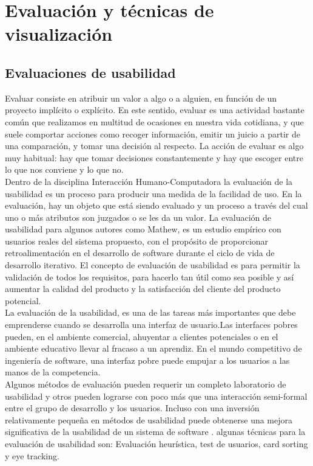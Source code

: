 \chapter{Evaluación y técnicas de visualización}\label{cap.Evaluacion}
\section{Evaluaciones de usabilidad}
Evaluar consiste en atribuir un valor a algo o a alguien, en función de un proyecto implícito o explícito. En este sentido, evaluar es una actividad bastante común que realizamos en multitud de ocasiones en nuestra vida cotidiana, y que suele comportar acciones como recoger información, emitir un juicio a partir de una comparación, y tomar una decisión al respecto. La acción de evaluar es algo muy habitual: hay que tomar decisiones constantemente y hay que escoger entre lo que nos conviene y lo que no.\\
Dentro de la disciplina Interacción Humano-Computadora la evaluación de la usabilidad es un proceso para producir una medida de la facilidad de uso. En la evaluación, hay un objeto que está siendo evaluado y un proceso a través del cual uno o más atributos son juzgados o se les da un valor. La evaluación de usabilidad para algunos autores como Mathew, es un estudio empírico con usuarios reales del sistema propuesto, con el propósito de proporcionar retroalimentación en el desarrollo de software durante el ciclo de vida de desarrollo iterativo. El concepto de evaluación de usabilidad es para permitir la validación de todos los requisitos, para hacerlo tan útil como sea posible y así aumentar la calidad del producto y la satisfacción del cliente del producto potencial.\\
La evaluación de la usabilidad, es una de las tareas más importantes que debe emprenderse cuando se desarrolla una interfaz de usuario.Las interfaces pobres pueden, en el ambiente comercial, ahuyentar a clientes potenciales o en el ambiente educativo llevar al fracaso a un aprendiz. En el mundo competitivo de ingeniería de software, una interfaz pobre puede empujar a los usuarios a las manos de la competencia.\\
Algunos métodos de evaluación pueden requerir un completo laboratorio de usabilidad y otros pueden lograrse con poco más que una interacción semi-formal entre el grupo de desarrollo y los usuarios. Incluso con una inversión relativamente pequeña en métodos de usabilidad puede obtenerse una mejora significativa de la usabilidad de un sistema de software \cite{obeso}.
algunas técnicas para la evaluación de usabilidad son: Evaluación heurística, test de usuarios, card sorting y eye tracking.
